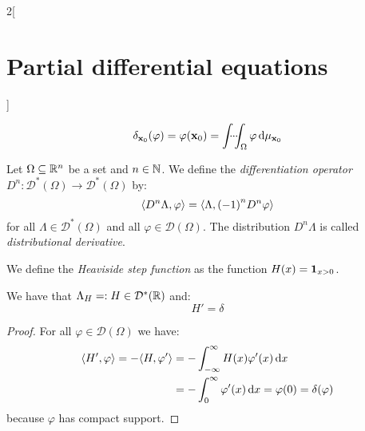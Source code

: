 \documentclass[../../../main_math.tex]{subfiles}
\begin{document}
\begin{multicols}{2}[\section{Partial differential equations}]
\begin{lemma}
    $$\delta_{\boldsymbol{\mathrm{x}}_0}(\varphi)=\varphi(\boldsymbol{\mathrm{x}}_0)=\idotsint_\Omega\varphi\dd{\mu_{\boldsymbol{\mathrm{x}}_0}}$$
  \end{lemma}
  \begin{definition}
    Let $\Omega\subseteq \mathbb{R}^n$ be a set and $n\in\mathbb{N}$. We define the \emph{differentiation operator} $D^n:\mathcal{D}^*(\Omega)\rightarrow\mathcal{D}^*(\Omega)$ by: $${\left\langle D^n\Lambda,\varphi\right\rangle}={\left\langle\Lambda,{(-1)}^nD^n\varphi\right\rangle}$$
    for all $\Lambda\in\mathcal{D}^*(\Omega)$ and all $\varphi\in\mathcal{D}(\Omega)$. The distribution $D^n\Lambda$ is called \emph{distributional derivative}.
  \end{definition}
  \begin{definition}
    We define the \emph{Heaviside step function} as the function $H(x)=\boldsymbol{\mathrm{1}}_{x>0}$.
  \end{definition}
  \begin{proposition}
    We have that $\Lambda_{H}=:H\in\mathcal{D}^*(\mathbb{R})$ and: $$H'=\delta$$
  \end{proposition}
  \begin{proof}
    For all $\varphi\in\mathcal{D}(\Omega)$ we have:
    \begin{align*}
      {\left\langle H',\varphi\right\rangle}=-{\left\langle H,\varphi'\right\rangle} & =-\int_{-\infty}^\infty H(x)\varphi'(x)\dd{x}                  \\
                                             & =-\int_{0}^\infty\varphi'(x)\dd{x}= \varphi(0)=\delta(\varphi)
    \end{align*}
    because $\varphi$ has compact support.
  \end{proof}

\end{multicols}
\end{document}
